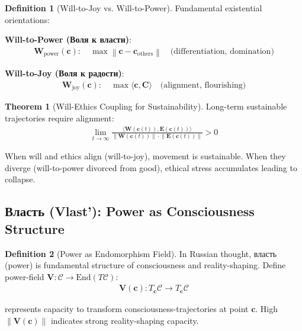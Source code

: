 \documentclass[11pt,a4paper]{article}
\theoremstyle{definition}
\newtheorem{definition}{Definition}[section]
\newtheorem{theorem}{Theorem}[section]
\theoremstyle{remark}
\newcommand{\CC}{\mathcal{C}}
\newcommand{\EE}{\mathbf{E}}
\newcommand{\WW}{\mathbf{W}}
\newcommand{\VV}{\mathbf{V}}
\newcommand{\cc}{\mathbf{c}}
\newcommand{\norm}[1]{\left\|#1\right\|}
\begin{document}
\begin{definition}[Will-to-Joy vs. Will-to-Power]
Fundamental existential orientations:

\textbf{Will-to-Power (Воля к власти)}:
\begin{align}
\WW_{\text{power}}(\cc): \quad \max \norm{\cc - \cc_{\text{others}}} \quad \text{(differentiation, domination)}
\end{align}

\textbf{Will-to-Joy (Воля к радости)}:
\begin{align}
\WW_{\text{joy}}(\cc): \quad \max \langle \cc, \mathbf{C} \rangle \quad \text{(alignment, flourishing)}
\end{align}
\end{definition}

\begin{theorem}[Will-Ethics Coupling for Sustainability]
Long-term sustainable trajectories require alignment:
\begin{align}
\lim_{t \to \infty} \frac{\langle \WW(\cc(t)), \EE(\cc(t)) \rangle}{\norm{\WW(\cc(t))} \cdot \norm{\EE(\cc(t))}} > 0
\end{align}

When will and ethics align (will-to-joy), movement is sustainable. When they diverge (will-to-power divorced from good), ethical stress accumulates leading to collapse.
\end{theorem}

\subsection{Власть (Vlast'): Power as Consciousness Structure}

\begin{definition}[Power as Endomorphism Field]
In Russian thought, власть (power) is fundamental structure of consciousness and reality-shaping. Define power-field \(\VV: \CC \to \text{End}(T\CC)\):
\begin{align}
\VV(\cc): T_{\cc}\CC \to T_{\cc}\CC
\end{align}

represents capacity to transform consciousness-trajectories at point \(\cc\). High \(\norm{\VV(\cc)}\) indicates strong reality-shaping capacity.
\end{definition}
\end{document}
